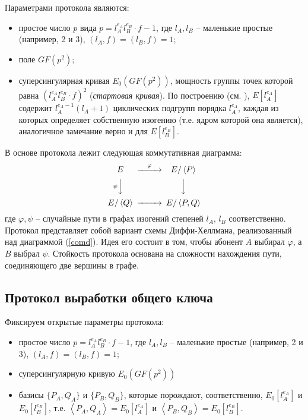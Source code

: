 \documentclass[a4paper,12pt]{article}
\newcommand{\tr}[1]{\left\langle #1\right\rangle}
\theoremstyle{definition}
\begin{document}
Параметрами протокола являются:
\begin{itemize}
 \item простое число $p$ вида $ p=l_A^{e_A}l_B^{e_B}\cdot f  - 1$, где $l_A,l_B$ -- маленькие простые (например, 2 и 3),
$(l_A,f)=(l_B,f)=1$;
\item поле $GF(p^2)$;
\item суперсингулярная кривая $E_0(GF(p^2))$, мощность группы точек которой равна $(l_A^{e_A}l_B^{e_B}\cdot f)^2$ (\emph{стартовая кривая}). По построению (см. \cite{DF}), $E[l_A^{e_A}]$ содержит $l_A^{e_A-1}(l_A+1)$ циклических подгрупп порядка $l_A^{e_A}$, каждая из которых определяет собственную изогению (т.е. ядром которой она является), аналогичное замечание  верно и для $E[l_B^{e_B}]$.
\end{itemize}

В основе протокола лежит следующая коммутативная диаграмма:
\begin{equation}\label{comd}
\begin{CD}
 E @>\varphi >> E/\tr{P} \\
 @V\psi VV @VVV \\
 E/\tr{Q} @>>> E/\tr{P,Q}
\end{CD}
\end{equation}
где $\varphi, \psi$ -- случайные пути в графах изогений степеней $l_A$, $l_B$ соответственно. Протокол представляет собой вариант схемы Диффи-Хеллмана, реализованный над диаграммой (\ref{comd}). Идея его состоит в том, чтобы абонент $A$ выбирал $\varphi$, а $B$ выбрал $\psi$. Стойкость протокола основана на 
сложности нахождения пути, соединяющего две вершины в графе. 

\subsection*{Протокол выработки общего ключа}



Фиксируем открытые параметры протокола:
\begin{itemize}
 \item простое число $  p=l_A^{e_A}l_B^{e_B}\cdot f  - 1$, где $l_A,l_B$ -- маленькие простые (например, 2 и 3),
$(l_A,f)=(l_B,f)=1$;
 \item суперсингулярную кривую $E_0(GF(p^2))$
 \item базисы $\{P_A,Q_A\}$ и $\{P_B,Q_B\}$, которые порождают, соответственно, $E_0[l_A^{e_A}]$ и $E_0[l_B^{e_B}]$, т.е. $\tr{P_A,Q_A}=E_0[l_A^{e_A}]$ и $\tr{P_B,Q_B}=E_0[l_B^{e_B}]$.

\end{itemize}
\end{document}
